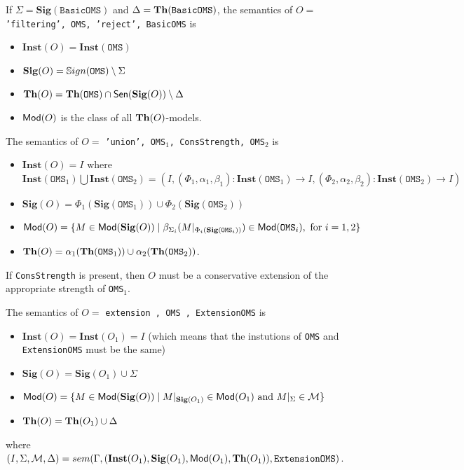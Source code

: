 \documentclass[10pt,fleqn,%
\ifpretendfinal
final%
\else
draft%
\fi,
]{scrreprt}
\newcommand*{\syntax}[1]{\texttt{#1}}
\newcommand{\Sig}{\mathbf{Sig}}
\newcommand{\Inst}{\ensuremath{\mathbf{Inst}}}
\begin{document}
\noindent
If $\Sigma = \Sig(\syntax{BasicOMS})$ and
$\Delta = \Th(\syntax{BasicOMS})$,
the semantics of $O =$
\syntax{'filtering', OMS, 'reject', BasicOMS} is
\begin{itemize}
  \item $\Inst(O) = \Inst(\syntax{OMS})$
  \item $\Sig(O) = \Sign(\syntax{OMS})\setminus \Sigma$ 
  \item $\Th(O) = \Th(\syntax{OMS})\cap\Sen(\Sig(O))\setminus\Delta$
  \item $\mathsf{Mod}(O)$ is the class of all $\mathbf{Th}(O)$-models.
\end{itemize}


The semantics of $O =$
\syntax{'union', OMS$_1$, ConsStrength, OMS$_2$} is
\begin{itemize}
  \item $\Inst(O) = I$ where
    $\Inst(\syntax{OMS}_1) \bigcup \Inst(\syntax{OMS}_2) =(I, (\Phi_1, \alpha_1,\beta_1) : \Inst(\syntax{OMS}_1) \rightarrow I, 
                    (\Phi_2, \alpha_2,\beta_2) : \Inst(\syntax{OMS}_2) \rightarrow I)$
  \item $\Sig(O) = \Phi_1(\Sig(\syntax{OMS}_1)) \cup \Phi_2(\Sig(\syntax{OMS}_2))$
  \item $\Mod(O) = \{ M\in \Mod(\Sig(O)) \mid \beta_{\Sigma_i}(M\forget{\Phi_i(\Sig(\syntax{OMS}_i))}) \in \Mod(\syntax{OMS}_i), \text{ for } i=1,2 \}$
  \item $\Th(O) = \alpha_1(\Th(\syntax{OMS}_1)) \cup \alpha_2(\Th(\syntax{OMS}_2))$.
\end{itemize}

If \syntax{ConsStrength} is present, then $O$ must be a conservative extension
of the appropriate strength of \syntax{OMS}$_1$.


The semantics of $O=$
\syntax{extension , OMS , ExtensionOMS} is

\begin{itemize}
  \item $\Inst(O) = \Inst(O_1) = I$ (which means that
  the instutions of \syntax{OMS} and 
  \syntax{ExtensionOMS} must be the same)
  \item $\Sig(O) = \Sig(O_1) \cup \Sigma$
  \item $\Mod(O) = \{ M\in \Mod(\Sig(O)) \mid M\forget{\Sig(O_1)} \in \Mod(O_1)
  \text{ and }
  M \forget{\Sigma} \in \cM\}$
  \item $\mathbf{Th}(O) = \mathbf{Th}(O_1) \cup \Delta$
\end{itemize}
\noindent where $(I, \Sigma,\cM, \Delta) = 
sem(\Gamma, (\Inst(O_1), \Sig(O_1), \Mod(O_1), \Th(O_1)), \syntax{ExtensionOMS})$. 
\end{document}
